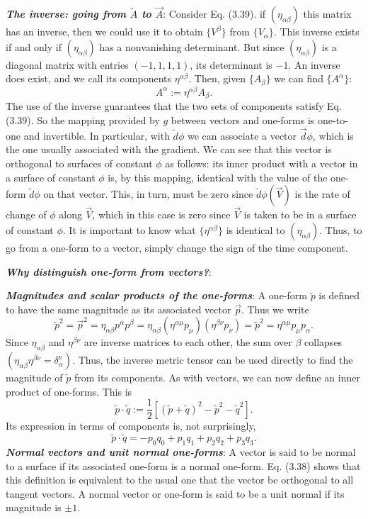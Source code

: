 \documentclass[12pt]{book}
\begin{document}
    \textit{\textbf{The inverse: going from $\tilde{A}$ to $\vec{A}$}}: Consider Eq. (3.39). if \((\eta_{\alpha\beta})\) this matrix has an inverse, then we could use it to obtain \(\{V^\beta\}\) from \(\{V_\alpha\}\). This inverse exists if and only if \((\eta_{\alpha\beta})\) has a nonvanishing determinant. But since \((\eta_{\alpha\beta})\) is a diagonal matrix with entries \((-1, 1, 1, 1)\), its determinant is \(-1\). An inverse does exist, and we call its components \(\eta^{\alpha\beta}\). Then, given \(\{A_\beta\}\) we can find \(\{A^\alpha\}\):
    \[
    A^\alpha := \eta^{\alpha\beta}A_\beta. \tag{3.43}
    \]
    The use of the inverse guarantees that the two sets of components satisfy Eq. (3.39). So the mapping provided by \(g\) between vectors and one-forms is one-to-one and invertible. 
    In particular, with \(\tilde{d}\phi\) we can associate a vector \(\vec{d}\phi\), which is the one usually associated with the gradient. We can see that this vector is orthogonal to surfaces of constant \(\phi\) as follows: its inner product with a vector in a surface of constant \(\phi\) is, by this mapping, identical with the value of the one-form \(\tilde{d}\phi\) on that vector. This, in turn, must be zero since \(\tilde{d}\phi(\vec{V})\) is the rate of change of \(\phi\) along \(\vec{V}\), which in this case is zero since \(\vec{V}\) is taken to be in a surface of constant \(\phi\).
    It is important to know what \(\{\eta^{\alpha\beta}\}\) is identical to \((\eta_{\alpha\beta})\). Thus, to go from a one-form to a vector, simply change the sign of the time component.
    
    \textit{\textbf{Why distinguish one-form from vectors?}}: 
    
    \textit{\textbf{Magnitudes and scalar products of the one-forms}}: 
    A one-form \(\tilde{p}\) is defined to have the same magnitude as its associated vector \(\vec{p}\). Thus we write
    \[
    \tilde{p}^2 = \vec{p}^2 = \eta_{\alpha\beta} p^\alpha p^\beta = \eta_{\alpha\beta} (\eta^{\alpha\mu} p_\mu)(\eta^{\beta\nu} p_\nu) = \tilde{p}^2 = \eta^{\alpha\mu} p_\mu p_\alpha. \tag{3.50}
    \]
    Since \(\eta_{\alpha\beta}\) and \(\eta^{\beta\nu}\) are inverse matrices to each other, the sum over \(\beta\) collapses \((\eta_{\alpha\beta}\eta^{\beta\nu} = \delta^\nu_\alpha)\). Thus, the inverse metric tensor can be used directly to find the magnitude of \(\tilde{p}\) from its components.
    As with vectors, we can now define an inner product of one-forms. This is
    \[
    \tilde{p} \cdot \tilde{q} := \frac{1}{2} \left[ (\tilde{p} + \tilde{q})^2 - \tilde{p}^2 - \tilde{q}^2 \right]. \tag{3.52}
    \]
    Its expression in terms of components is, not surprisingly,
    \[
    \tilde{p} \cdot \tilde{q} = -p_0 q_0 + p_1 q_1 + p_2 q_2 + p_3 q_3. \tag{3.53}
    \]
    \textit{\textbf{Normal vectors and unit normal one-forms}}:
    A vector is said to be normal to a surface if its associated one-form is a normal one-form. Eq. (3.38) shows that this definition is equivalent to the usual one that the vector be orthogonal to all tangent vectors. A normal vector or one-form is said to be a unit normal if its magnitude is \(\pm 1\).
\end{document}
